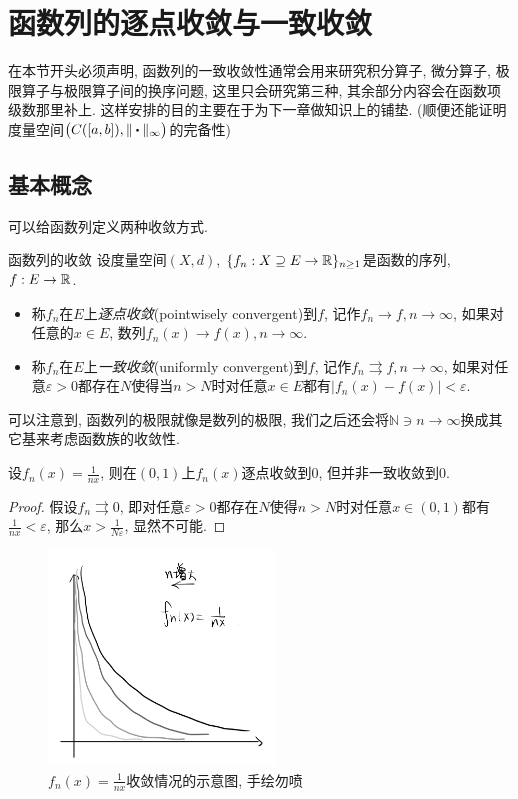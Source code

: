 \newpage
\section{函数列的逐点收敛与一致收敛}

在本节开头必须声明, 函数列的一致收敛性通常会用来研究积分算子, 微分算子, 极限算子与极限算子间的换序问题, 这里只会研究第三种, 其余部分内容会在函数项级数那里补上. 这样安排的目的主要在于为下一章做知识上的铺垫. (顺便还能证明度量空间$\big( C([a,b]),\| \bigcdot \|_{\infty} \big)$的完备性)

\subsection{基本概念}

可以给函数列定义两种收敛方式. 

\begin{definition}{函数列的收敛}
	设度量空间$(X,d)$, $\{ f_n :X \supseteq E \to \mathbb{R} \}_{n\geq 1}$是函数的序列, $f:E \to \mathbb{R}$. 
	\begin{itemize}
		\item 称$f_n$在$E$上\textit{逐点收敛}(pointwisely convergent)到$f$, 记作$f_n \to f,n\to \infty$, 如果对任意的$x \in E$, 数列$f_n(x) \to f(x),n \to \infty$. 
		\item 称$f_n$在$E$上\textit{一致收敛}(uniformly convergent)到$f$, 记作$f_n \rightrightarrows f,n\to \infty$, 如果对任意$\varepsilon >0$都存在$N$使得当$n>N$时对任意$x \in E$都有$|f_n(x)-f(x)|<\varepsilon$. 
	\end{itemize}
\end{definition}
\begin{remark}
	可以注意到, 函数列的极限就像是数列的极限, 我们之后还会将$\mathbb{N} \ni n \to \infty$换成其它基来考虑函数族的收敛性. 
\end{remark}

\begin{example}
	设$f_n(x)=\frac{1}{nx}$, 则在$(0,1)$上$f_n(x)$逐点收敛到$0$, 但并非一致收敛到$0$. 
\end{example}
\begin{proof}
	假设$f_n \rightrightarrows 0$, 即对任意$\varepsilon >0$都存在$N$使得$n>N$时对任意$x \in (0,1)$都有$\frac{1}{nx}<\varepsilon$, 那么$x > \frac{1}{N\varepsilon}$, 显然不可能. 
\end{proof}

\begin{figure}[H]
	\centering
	\includegraphics[width=6cm]{attachment/IMG_3545.jpg}
	\caption{$f_n(x)=\frac{1}{nx}$收敛情况的示意图, 手绘勿喷}
\end{figure}


